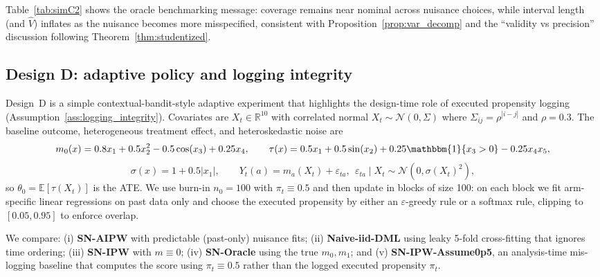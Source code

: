 \documentclass[11pt]{article}
\numberwithin{equation}{section}
\theoremstyle{plain}
\theoremstyle{definition}
\theoremstyle{remark}
\newcommand{\E}{\mathbb{E}}
\newcommand{\ind}[1]{\mathbbm{1}\{#1\}}
\begin{document}
Table~\ref{tab:simC2} shows the oracle benchmarking message: coverage remains near nominal across nuisance choices, while interval length (and $\widehat V$) inflates as the nuisance becomes more misspecified, consistent with Proposition~\ref{prop:var_decomp} and the ``validity vs precision'' discussion following Theorem~\ref{thm:studentized}.

\subsection{Design D: adaptive policy and logging integrity}\label{sec:sim_D}

Design~D is a simple contextual-bandit-style adaptive experiment that highlights the design-time role of executed propensity logging (Assumption~\ref{ass:logging_integrity}). Covariates are $X_t\in\mathbb{R}^{10}$ with correlated normal $X_t\sim\mathcal{N}(0,\Sigma)$ where $\Sigma_{ij}=\rho^{|i-j|}$ and $\rho=0.3$. The baseline outcome, heterogeneous treatment effect, and heteroskedastic noise are
\[
m_0(x)=0.8x_1+0.5x_2^2-0.5\cos(x_3)+0.25x_4,\qquad
\tau(x)=0.5x_1+0.5\sin(x_2)+0.25\ind{x_3>0}-0.25x_4x_5,
\]
\[
\sigma(x)=1+0.5|x_1|,\qquad
Y_t(a)=m_a(X_t)+\varepsilon_{ta},\ \ \varepsilon_{ta}\mid X_t\sim \mathcal{N}(0,\sigma(X_t)^2),
\]
so $\theta_0=\E[\tau(X_t)]$ is the ATE. We use burn-in $n_0=100$ with $\pi_t\equiv 0.5$ and then update in blocks of size 100: on each block we fit arm-specific linear regressions on past data only and choose the executed propensity by either an $\varepsilon$-greedy rule or a softmax rule, clipping to $[0.05,0.95]$ to enforce overlap.

We compare: (i) \textbf{SN-AIPW} with predictable (past-only) nuisance fits; (ii) \textbf{Naive-iid-DML} using leaky 5-fold cross-fitting that ignores time ordering; (iii) \textbf{SN-IPW} with $m\equiv 0$; (iv) \textbf{SN-Oracle} using the true $m_0,m_1$; and (v) \textbf{SN-IPW-Assume0p5}, an analysis-time mis-logging baseline that computes the score using $\pi_t\equiv 0.5$ rather than the logged executed propensity $\pi_t$.
\end{document}
